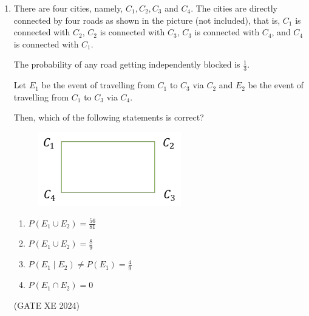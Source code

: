 \documentclass[12pt]{article}
\begin{document}
\begin{enumerate}
$$
(2 + x^2)\,\frac{d^2y}{dx^2} + x\,\frac{dy}{dx} - ky = 0,
$$

where $k$ is a real constant. If $y(1) = 1$, then the value of the integral  

$$
\int_{0}^{1} 2y \, dx
$$

is  

\begin{enumerate}
\item $\tfrac{1}{3}$  
\item $\tfrac{2}{3}$  
\item $1$  
\item $\tfrac{4}{3}$  
\end{enumerate}
(GATE XE 2024)

\item There are four cities, namely, $C_1, C_2, C_3$ and $C_4$. The cities are directly connected by four roads as shown in the picture (not included), that is, $C_1$ is connected with $C_2$, $C_2$ is connected with $C_3$, $C_3$ is connected with $C_4$, and $C_4$ is connected with $C_1$.  

The probability of any road getting independently blocked is $\tfrac{1}{3}$.  

Let $E_1$ be the event of travelling from $C_1$ to $C_3$ via $C_2$ and $E_2$ be the event of travelling from $C_1$ to $C_3$ via $C_4$.  

Then, which of the following statements is correct?  

\begin{figure}[H]
    \centering
    \includegraphics[width=0.5\columnwidth]{figs/ass5_a_q13.png}
    \caption{}
    \label{fig:placeholder}
\end{figure}

\begin{enumerate}
\item $P(E_1 \cup E_2) = \tfrac{56}{81}$  
\item $P(E_1 \cup E_2) = \tfrac{8}{9}$  
\item $P(E_1 \mid E_2) \neq P(E_1) = \tfrac{4}{9}$  
\item $P(E_1 \cap E_2) = 0$   
\end{enumerate}
(GATE XE 2024)


\end{enumerate}
\end{document}
